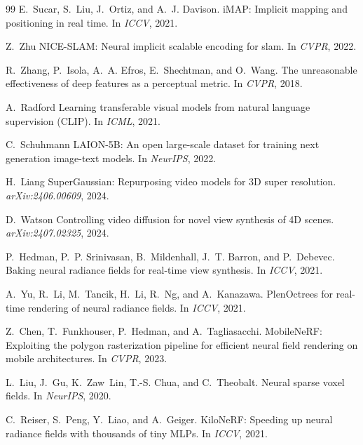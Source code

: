 \begin{thebibliography}{99}
E.~Sucar, S.~Liu, J.~Ortiz, and A.~J. Davison.
{iMAP}: Implicit mapping and positioning in real time.
In \emph{ICCV}, 2021.


Z.~Zhu \etal
{NICE-SLAM}: Neural implicit scalable encoding for slam.
In \emph{CVPR}, 2022.


R.~Zhang, P.~Isola, A.~A. Efros, E.~Shechtman, and O.~Wang.
The unreasonable effectiveness of deep features as a perceptual metric.
In \emph{CVPR}, 2018.


A.~Radford \etal
Learning transferable visual models from natural language supervision ({CLIP}).
In \emph{ICML}, 2021.


C.~Schuhmann \etal
{LAION-5B}: An open large-scale dataset for training next generation
image-text models.
In \emph{NeurIPS}, 2022.


H.~Liang \etal
{SuperGaussian}: Repurposing video models for 3{D} super resolution.
\emph{arXiv:2406.00609}, 2024.


D.~Watson \etal
Controlling video diffusion for novel view synthesis of 4{D} scenes.
\emph{arXiv:2407.02325}, 2024.

P.~Hedman, P.~P. Srinivasan, B.~Mildenhall, J.~T. Barron, and P.~Debevec.
Baking neural radiance fields for real-time view synthesis.
In \emph{ICCV}, 2021.

A.~Yu, R.~Li, M.~Tancik, H.~Li, R.~Ng, and A.~Kanazawa.
{PlenOctrees} for real-time rendering of neural radiance fields.
In \emph{ICCV}, 2021.

Z.~Chen, T.~Funkhouser, P.~Hedman, and A.~Tagliasacchi.
{MobileNeRF}: Exploiting the polygon rasterization pipeline for efficient
neural field rendering on mobile architectures.
In \emph{CVPR}, 2023.

L.~Liu, J.~Gu, K.~Zaw~Lin, T.-S. Chua, and C.~Theobalt.
Neural sparse voxel fields.
In \emph{NeurIPS}, 2020.

C.~Reiser, S.~Peng, Y.~Liao, and A.~Geiger.
{KiloNeRF}: Speeding up neural radiance fields with thousands of tiny {MLPs}.
In \emph{ICCV}, 2021.


\end{thebibliography}
